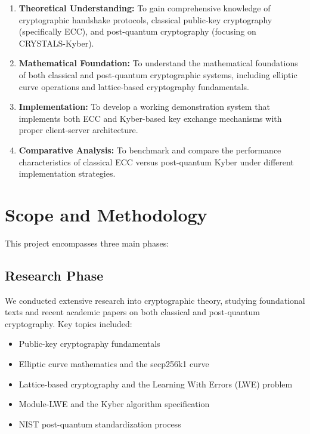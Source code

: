 \begin{enumerate}
\item \textbf{Theoretical Understanding:} To gain comprehensive knowledge of cryptographic handshake protocols, classical public-key cryptography (specifically ECC), and post-quantum cryptography (focusing on CRYSTALS-Kyber).

\item \textbf{Mathematical Foundation:} To understand the mathematical foundations of both classical and post-quantum cryptographic systems, including elliptic curve operations and lattice-based cryptography fundamentals.

\item \textbf{Implementation:} To develop a working demonstration system that implements both ECC and Kyber-based key exchange mechanisms with proper client-server architecture.

\item \textbf{Comparative Analysis:} To benchmark and compare the performance characteristics of classical ECC versus post-quantum Kyber under different implementation strategies.

\end{enumerate}

\section{Scope and Methodology}

This project encompasses three main phases:

\subsection{Research Phase}
We conducted extensive research into cryptographic theory, studying foundational texts and recent academic papers on both classical and post-quantum cryptography. Key topics included:
\begin{itemize}
\item Public-key cryptography fundamentals
\item Elliptic curve mathematics and the secp256k1 curve
\item Lattice-based cryptography and the Learning With Errors (LWE) problem
\item Module-LWE and the Kyber algorithm specification
\item NIST post-quantum standardization process
\end{itemize}

